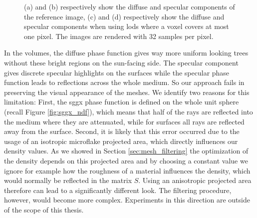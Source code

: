 \begin{figure}[t]
\begin{subfigure}[b]{0.49\linewidth}
        \caption{}
    \end{subfigure}
    \caption[Diffuse and specular components rendered separately]{(a) and (b) respectively show the diffuse and specular components of the reference image, (c) and (d) respectively show the diffuse and specular components when using \acsp{lod} where a voxel covers at most one pixel. The images are rendered with 32 samples per pixel.}
	\label{fig:diffuse_specular_breakdown}
\end{figure}
In the volumes, the diffuse phase function gives way more uniform looking trees without these bright regions on the sun-facing side.
The specular component gives discrete specular highlights on the surfaces while the specular phase function leads to reflections across the whole medium.
So our approach fails in preserving the visual appearance of the meshes.
We identify two reasons for this limitation: First, the \ac{sggx} phase function is defined on the whole unit sphere (recall Figure \ref{fig:sggx_ndf}), which means that half of the rays are reflected into the medium where they are attenuated, while for surfaces all rays are reflected away from the surface.
Second, it is likely that this error occurred due to the usage of an isotropic microflake projected area, which directly influences our density values.
As we showed in Section \ref{sec:mesh_filtering} the optimization of the density depends on this projected area and by choosing a constant value we ignore for example how the roughness of a material influences the density, which would normally be reflected in the matrix $S$. %
Using an anisotropic projected area therefore can lead to a significantly different look.
The filtering procedure, however, would become more complex.
Experiments in this direction are outside of the scope of this thesis.


